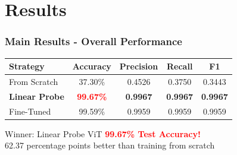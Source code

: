 \documentclass[aspectratio=169]{beamer}
\begin{document}
\section{Results}

\begin{frame}
    \frametitle{Main Results - Overall Performance}

    \begin{table}
        \centering
        \Large
        \begin{tabular}{lcccc}
            \toprule
            \textbf{Strategy} & \textbf{Accuracy} & \textbf{Precision} & \textbf{Recall} & \textbf{F1} \\
            \midrule
            From Scratch & 37.30\% & 0.4526 & 0.3750 & 0.3443 \\
            \textbf{Linear Probe} & \textcolor{red}{\textbf{99.67\%}} & \textbf{0.9967} & \textbf{0.9967} & \textbf{0.9967} \\
            Fine-Tuned & 99.59\% & 0.9959 & 0.9959 & 0.9959 \\
            \bottomrule
        \end{tabular}
    \end{table}

    \vspace{0.15cm}

    \begin{block}{Winner: Linear Probe ViT}
        \centering
        \Large \textcolor{red}{\textbf{99.67\% Test Accuracy!}}\\
        \normalsize
        62.37 percentage points better than training from scratch
    \end{block}
\end{frame}
\end{document}
